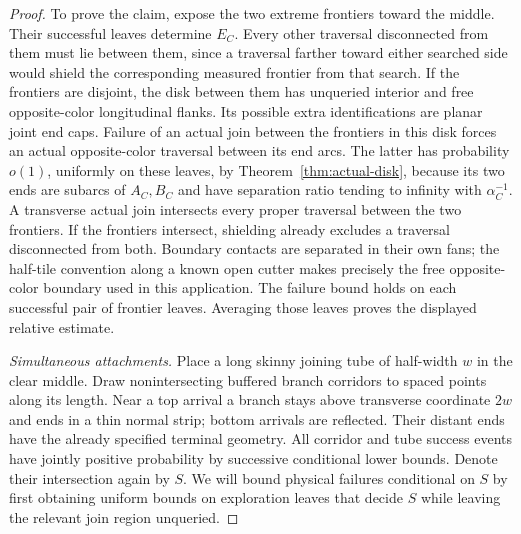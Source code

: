 \begin{proof}
To prove the claim, expose the two extreme frontiers toward the
middle. Their successful leaves determine $E_C$. Every other
traversal disconnected from them must
lie between them, since a traversal farther toward either searched
side would shield the corresponding measured frontier from that
search. If the frontiers are disjoint, the disk between them has
unqueried interior and free opposite-color longitudinal flanks. Its
possible extra identifications are planar joint end caps. Failure of
an actual join between the frontiers in this disk forces an actual
opposite-color traversal between its end arcs. The latter has
probability $o(1)$, uniformly on these leaves, by
Theorem~\ref{thm:actual-disk}, because its two ends are subarcs of
$A_C,B_C$ and have separation ratio tending to infinity with
$\alpha_C^{-1}$. A transverse actual join intersects
every proper traversal between the two frontiers. If the frontiers
intersect, shielding already excludes a traversal disconnected from
both. Boundary contacts are separated in their own fans; the
half-tile convention along a known open cutter makes precisely the
free opposite-color boundary used in this application. The failure
bound holds on each successful pair of frontier leaves. Averaging
those leaves proves the displayed relative estimate.

\emph{Simultaneous attachments.}
Place a long skinny joining tube of half-width $w$ in the clear middle.
Draw nonintersecting buffered branch corridors to spaced points along
its length. Near a top arrival a branch stays above transverse
coordinate $2w$ and ends in a thin normal strip; bottom arrivals are
reflected. Their distant ends have the already specified terminal
geometry. All corridor and tube success events have jointly positive
probability by successive conditional lower bounds. Denote their
intersection again by $S$. We will bound physical failures conditional
on $S$ by first obtaining uniform bounds on exploration leaves that
decide $S$ while leaving the relevant join region unqueried.


\end{proof}
